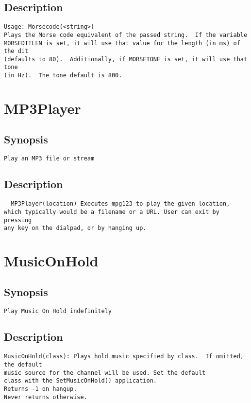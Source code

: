 \subsection{Description}
\begin{verbatim}
Usage: Morsecode(<string>)
Plays the Morse code equivalent of the passed string.  If the variable
MORSEDITLEN is set, it will use that value for the length (in ms) of the dit
(defaults to 80).  Additionally, if MORSETONE is set, it will use that tone
(in Hz).  The tone default is 800.

\end{verbatim}


\section{MP3Player}
\subsection{Synopsis}
\begin{verbatim}
Play an MP3 file or stream
\end{verbatim}
\subsection{Description}
\begin{verbatim}
  MP3Player(location) Executes mpg123 to play the given location,
which typically would be a filename or a URL. User can exit by pressing
any key on the dialpad, or by hanging up.
\end{verbatim}


\section{MusicOnHold}
\subsection{Synopsis}
\begin{verbatim}
Play Music On Hold indefinitely
\end{verbatim}
\subsection{Description}
\begin{verbatim}
MusicOnHold(class): Plays hold music specified by class.  If omitted, the default
music source for the channel will be used. Set the default 
class with the SetMusicOnHold() application.
Returns -1 on hangup.
Never returns otherwise.

\end{verbatim}


